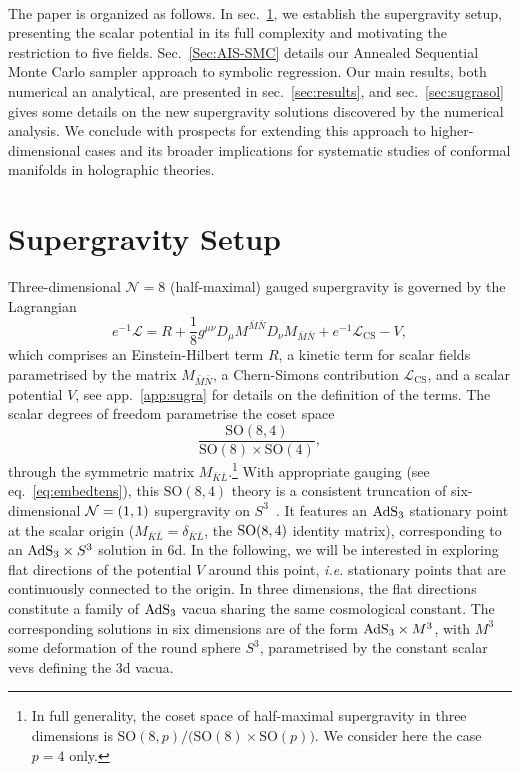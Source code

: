 \documentclass[11pt,a4paper]{article}
\newcommand{\bK}{{\bar{K}}}
\newcommand{\bL}{{\bar{L}}}
\newcommand{\bM}{{\bar{M}}}
\newcommand{\bN}{{\bar{N}}}
\begin{document}
\paragraph{}
The paper is organized as follows. In sec.~\ref{sec:sugra}, we establish the supergravity setup, presenting the scalar potential in its full complexity and motivating the restriction to five fields. Sec.~\ref{Sec:AIS-SMC} details our Annealed Sequential Monte Carlo sampler approach to symbolic regression. Our main results, both numerical an analytical, are presented in sec.~\ref{sec:results}, and sec.~\ref{sec:sugrasol} gives some details on the new supergravity solutions discovered by the numerical analysis. We conclude with prospects for extending this approach to higher-dimensional cases and its broader implications for systematic studies of conformal manifolds in holographic theories.


\section{Supergravity Setup} \label{sec:sugra}
Three-dimensional $\mathcal{N}=8$ (half-maximal) gauged supergravity is governed by the Lagrangian~\cite{Nicolai:2001ac,deWit:2003ja}
%
\begin{equation}	\label{eq: lagrangian_rephrased} 
	e^{-1}\mathcal{L}=R+\frac1{8}g^{\mu\nu}D_\mu M^{\bM\bN}D_\nu M_{\bM\bN}+e^{-1}\mathcal{L}_{\text{CS}}-V,
\end{equation}
%
which comprises an Einstein-Hilbert term $R$, a kinetic term for scalar fields parametrised by the matrix $M_{\bM\bN}$, a Chern-Simons contribution $\mathcal{L}_{\text{CS}}$, and a scalar potential $V$, see app.~\ref{app:sugra} for details on the definition of the terms. The scalar degrees of freedom parametrise the coset space
%
\begin{equation}	\label{eq: scalarcoset_rephrased}
	\frac{\text{SO}(8,4)}{\text{SO}(8)\times\text{SO}(4)},
\end{equation}
%
through the symmetric matrix $M_{\bK\bL}$.\footnote{In full generality, the coset space of half-maximal supergravity in three dimensions is $\text{SO}(8,p)/\big(\text{SO}(8)\times\text{SO}(p)\big)$. We consider here the case $p=4$ only.} With appropriate gauging (see eq.~\eqref{eq:embedtens}), this $\text{SO}(8,4)$ theory is a consistent truncation of six-dimensional ${\cal N}=(1,1)$ supergravity on $S^{3}$~\cite{Cvetic:2000dm,Deger:2014ofa,Hohm:2017wtr}. It features an ${\rm AdS}_{3}$ stationary point at the scalar origin ($M_{\bK\bL}=\delta_{\bK\bL}$, the ${\rm SO}(8,4)$ identity matrix), corresponding to an ${\rm AdS}_{3}\times S^{3}$ solution in 6d. In the following, we will be interested in exploring flat directions of the potential $V$ around this point, \textit{i.e.} stationary points that are continuously connected to the origin. In three dimensions, the flat directions constitute a family of ${\rm AdS}_{3}$ vacua sharing the same cosmological constant. The corresponding solutions in six dimensions are of the form ${\rm AdS}_{3}\times M^{3}$, with $M^{3}$ some deformation of the round sphere $S^{3}$, parametrised by the constant scalar vevs defining the 3d vacua.
\end{document}
